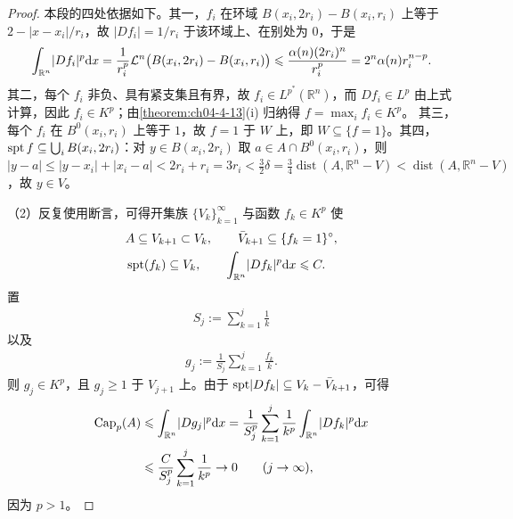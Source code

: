 \documentclass[../../main.tex]{subfiles}%
\begin{document}
\begin{proof}
本段的四处依据如下。其一，$f_i$ 在环域 $B(x_i,2r_i)-B(x_i,r_i)$ 上等于 $2-\lvert x-x_i\rvert/r_i$，故 $\lvert Df_i\rvert=1/r_i$ 于该环域上、在别处为 $0$，于是
\begin{align*}
\int_{\mathbb{R}^n}\lvert Df_i\rvert^p\mathrm{d} x=\frac{1}{r_i^p}\mathcal{L}^n\bigl(B(x_i,2r_i)-B(x_i,r_i)\bigr)\leqslant\frac{\alpha(n)(2r_i)^n}{r_i^p}=2^n\alpha(n)r_i^{n-p}.
\end{align*}
其二，每个 $f_i$ 非负、具有紧支集且有界，故 $f_i\in L^{p^*}(\mathbb{R}^n)$，而 $Df_i\in L^p$ 由上式计算，因此 $f_i\in K^p$；由\cref{theorem:ch04-4-13}(i) 归纳得 $f=\max_i f_i\in K^p$。%
其三，每个 $f_i$ 在 $B^{0}(x_i,r_i)$ 上等于 $1$，故 $f=1$ 于 $W$ 上，即 $W\subseteq\{f=1\}$。其四，$\operatorname{spt} f\subseteq\bigcup_iB(x_i,2r_i)$：对 $y\in B(x_i,2r_i)$ 取 $a\in A\cap B^{0}(x_i,r_i)$，则 $\lvert y-a\rvert\leqslant\lvert y-x_i\rvert+\lvert x_i-a\rvert<2r_i+r_i=3r_i<\frac32\delta=\frac34\operatorname{dist}(A,\mathbb{R}^n-V)<\operatorname{dist}(A,\mathbb{R}^n-V)$，故 $y\in V$。

（2）反复使用断言，可得开集族 $\{V_k\}_{k=1}^{\infty}$ 与函数 $f_k\in K^p$ 使
\begin{align*}
&A\subseteq V_{k+1}\subset V_k,\qquad\bar V_{k+1}\subseteq\{f_k=1\}^{\circ},\\
&\operatorname{spt}(f_k)\subseteq V_k,\qquad\int_{\mathbb{R}^n}\lvert Df_k\rvert^p\mathrm{d} x\leqslant C .
\end{align*}
置
\begin{align*}
S_j:=\sum_{k=1}^j\frac1k
\end{align*}
以及
\begin{align*}
g_j:=\frac{1}{S_j}\sum_{k=1}^j\frac{f_k}{k}.
\end{align*}
则 $g_j\in K^p$，且 $g_j\geqslant1$ 于 $V_{j+1}$ 上。由于 $\operatorname{spt}\lvert Df_k\rvert\subseteq V_k-\bar V_{k+1}$，可得
\begin{align*}
\operatorname{Cap}_p(A)&\leqslant\int_{\mathbb{R}^n}\lvert Dg_j\rvert^p\mathrm{d} x=\frac{1}{S_j^p}\sum_{k=1}^j\frac{1}{k^p}\int_{\mathbb{R}^n}\lvert Df_k\rvert^p\mathrm{d} x\\
&\leqslant\frac{C}{S_j^p}\sum_{k=1}^j\frac{1}{k^p}\to0\qquad(j\to\infty),
\end{align*}
因为 $p>1$。


\end{proof}
\end{document}
